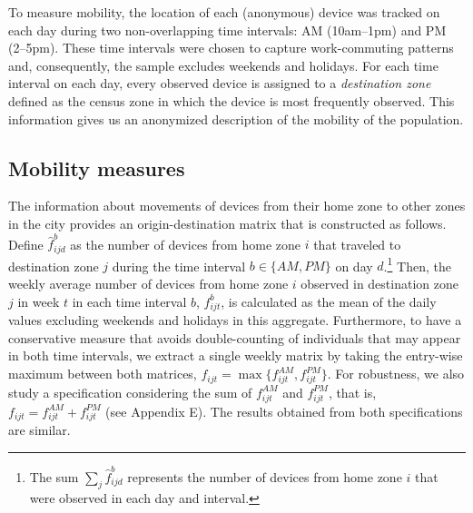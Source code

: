 
To measure mobility, the location of each (anonymous) device was tracked on each day during two non-overlapping time intervals: AM (10am--1pm) and PM (2--5pm). These time intervals were chosen to capture work-commuting patterns and, consequently, the sample excludes weekends and holidays.  For each time interval on each day, every observed device is assigned to  a \textit{destination zone} defined as the census zone in which the device is most frequently observed. This information gives us an anonymized description of the mobility of the population. 

\subsection{Mobility measures} \label{sec:mob_meas}

The information about movements of devices from their home zone to other zones in the city provides an origin-destination matrix that is constructed as follows.  Define $\hat f^b_{ijd}$ as the number of devices from home zone $i$ that traveled to destination zone $j$ during the time interval $b\in\{AM,PM\}$ on day $d$.\footnote{The sum $\sum_j \hat f^b_{ijd}$ represents the number of devices from home zone $i$ that were observed in each day and interval.} Then, the weekly average number of devices from home zone $i$ observed in destination zone $j$ in week $t$ in each time interval $b$, $f_{ijt}^b$, is calculated as the mean of the daily values excluding weekends and holidays in this aggregate. Furthermore, to have a conservative measure that avoids double-counting of individuals that may appear in both time intervals, we extract a single weekly matrix by taking the entry-wise maximum between both matrices, $f_{ijt}=\max\{f_{ijt}^{AM}, f_{ijt}^{PM}\}$. For robustness, we also study a specification considering the sum of $f_{ijt}^{AM}$ and $f_{ijt}^{PM}$, that is, $f_{ijt}=f_{ijt}^{AM} + f_{ijt}^{PM}$ (see Appendix E). The results obtained from both specifications are similar. %

